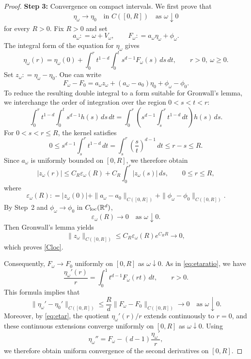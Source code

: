 \documentclass[12pt, a4paper, reqno]{amsart}
\numberwithin{equation}{section}
\theoremstyle{definition}
\theoremstyle{remark}
\newcommand{\R}{\mathbb R}
\newcommand{\ce}{\mathrel{\mathop:}=}
\begin{document}
\begin{proof}
\medskip
\noindent\textbf{Step 3:} Convergence on compact intervals.
We first prove that
\begin{align}
\label{Cloc}
  \eta_\omega\to\eta_0
  \quad\text{in }C([0,R])
  \quad\text{as }\omega\downarrow0
\end{align}
for every $R>0$. Fix $R>0$ and set
\[
  a_\omega\ce \omega+V_\omega,\qquad
  F_\omega\ce a_\omega\eta_\omega+\phi_\omega.
\]
The integral form of the equation for $\eta_\omega$ gives
\[
  \eta_\omega(r)
  =\eta_\omega(0)
  +\int_0^r t^{1-d}
    \int_0^t s^{d-1}F_\omega(s)\,ds\,dt,\qquad r>0,~\omega\ge0.
\]
Set $z_\omega\ce \eta_\omega-\eta_0$. One can write
\[
  F_\omega-F_0
  =a_\omega z_\omega
   +(a_\omega-a_0)\eta_0
   +\phi_\omega-\phi_0.
\]
To reduce the resulting double integral to a form suitable for Gronwall's lemma, we
interchange the order of integration over the region $0<s<t<r$:
\[
  \int_0^r t^{1-d}
    \int_0^t s^{d-1}h(s)\,ds\,dt
  =
  \int_0^r
    \left(
      s^{d-1}\int_s^r t^{1-d}\,dt
    \right)h(s)\,ds.
\]
For $0<s<r\le R$, the kernel satisfies
\[
  0\le
  s^{d-1}\int_s^r t^{1-d}\,dt
  =
  \int_s^r
    \left(\frac{s}{t}\right)^{d-1}\,dt
  \le r-s\le R.
\]
Since $a_\omega$ is uniformly bounded on $[0,R]$, we therefore obtain
\[
  |z_\omega(r)|
  \le
  C_R\varepsilon_\omega(R)
  +C_R\int_0^r |z_\omega(s)|\,ds,
  \qquad 0\le r\le R,
\]
where
\[
  \varepsilon_\omega(R)
  \ce
  |z_\omega(0)|
  +\|a_\omega-a_0\|_{C([0,R])}
  +\|\phi_\omega-\phi_0\|_{C([0,R])}.
\]
By Step~2 and $\phi_\omega\to\phi_0$ in $C_{\rm loc}(\R^d)$,
\[
  \varepsilon_\omega(R)\to0
  \quad\text{as }\omega\downarrow0.
\]
Then Gronwall's lemma yields
\[
  \|z_\omega\|_{C([0,R])}
  \le
  C_R\varepsilon_\omega(R)e^{C_RR}
  \to0,
\]
which proves \eqref{Cloc}.

Consequently, $F_\omega\to F_0$ uniformly on $[0,R]$ as
$\omega\downarrow0$. 
As in \eqref{eq:etaratio}, we have
\begin{equation}\label{eq:etar}
  \frac{\eta_\omega'(r)}r
  =\int_0^1 t^{d-1}F_\omega(rt)\,dt,
  \qquad r>0.
\end{equation}
This formula implies that
\[
  \|\eta_\omega'-\eta_0'\|_{C([0,R])}
  \le
  \frac{R}{d}
  \|F_\omega-F_0\|_{C([0,R])}
  \to0
  \quad\text{as }\omega\downarrow0.
\]
Moreover, by \eqref{eq:etar}, the quotient
$\eta_\omega'(r)/r$ extends continuously to $r=0$, and these continuous
extensions converge uniformly on $[0,R]$ as $\omega\downarrow0$.
Using
\[
  \eta_\omega''
  =F_\omega-(d-1)\frac{\eta_\omega'}r,
\]
we therefore obtain uniform convergence of the second derivatives on
$[0,R]$.
\end{proof}
\end{document}
